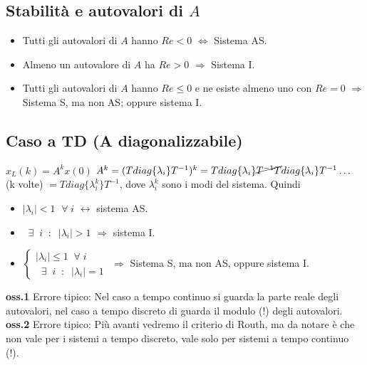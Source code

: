 \subsection{Stabilità e autovalori di $A$}
\begin{itemize}
    \item Tutti gli autovalori di $A$ hanno $Re <0$ $\Longleftrightarrow$ Sistema AS.
    \item Almeno un autovalore di $A$ ha $Re > 0$ $\Longrightarrow$ Sistema I.
    \item Tutti gli autovalori di $A$ hanno $Re \leq 0$ e ne esiste almeno uno con $Re = 0$ $\Longrightarrow$ Sistema S, ma non AS; oppure sistema I.
\end{itemize}
\subsection{Caso a TD (A diagonalizzabile)}
$x_L(k) = A^k x(0)$\newline
$A^k = (T diag\{\lambda_i\} T^{-1})^k = T diag\{\lambda_i\}\cancel{T^{-1}T} diag\{\lambda_i\} T^{-1} \dots$ (k volte) $= T diag\{\lambda_i^k\}T^{-1}$, dove $\lambda_i^{k}$ sono i modi del sistema.\newline
\newline
Quindi
\begin{itemize}
    \item $|\lambda_i| < 1$ $\;\forall\;i$ $\longleftrightarrow$ sistema AS.
    \item $\;\;\exists\;\; i \;\;:\;\; |\lambda_i| > 1$ $\Longrightarrow$ sistema I.
    \item $\begin{cases}
        |\lambda_i| \leq 1 \;\;\forall\; i\\
        \;\;\exists\;\;i \;\;:\;\;|\lambda_i| = 1 
    \end{cases}$ $\Longrightarrow$ Sistema S, ma non AS, oppure sistema I.
\end{itemize}
\textbf{oss.1} Errore tipico: Nel caso a tempo continuo si guarda la parte reale degli autovalori, nel caso a tempo discreto di guarda il modulo (!) degli autovalori.\newline
\textbf{oss.2} Errore tipico: Più avanti vedremo il criterio di Routh, ma da notare è che non vale per i sistemi a tempo discreto, vale solo per sistemi a tempo continuo (!).
